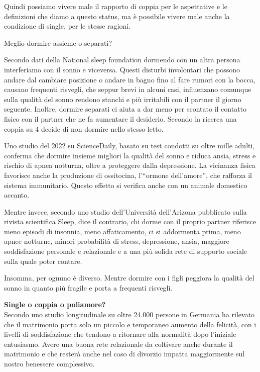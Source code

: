 \documentclass[12pt]{book} %
\begin{document}
Quindi possiamo vivere male il rapporto di coppia per le aspettative e le definizioni che diamo a questo status, ma è
possibile vivere male anche la condizione di single, per le stesse ragioni.

\begin{mdframed}[linewidth=1pt]
Meglio dormire assieme o separati? 

Secondo dati della National sleep foundation dormendo con un altra persona interferiamo con il sonno e viceversa. Questi
disturbi involontari che possono andare dal cambiare posizione o andare in bagno fino al fare rumori con la bocca,
causano frequenti risvegli, che seppur brevi in alcuni casi, influenzano comunque sulla qualità del sonno rendono
stanchi e più irritabili con il partner il giorno seguente. Inoltre, dormire separati ci aiuta a dar meno per scontato
il contatto fisico con il partner che ne fa aumentare il desiderio. Secondo la ricerca una coppia su 4 decide di non
dormire nello stesso letto.

Uno studio del 2022 su ScienceDaily, basato su test condotti su oltre mille adulti, conferma che dormire insieme migliori la qualità del sonno e riduca ansia, stress e rischio di apnea notturna, oltre a proteggere dalla depressione. La vicinanza fisica favorisce anche la produzione di ossitocina, l'“ormone dell'amore”, che rafforza il sistema immunitario. Questo effetto si verifica anche con un animale domestico accanto.

Mentre invece, secondo uno studio dell'Università dell'Arizona pubblicato sulla rivista scientifica
Sleep, dice il contrario, chi
dorme con il proprio partner riferisce meno episodi di insonnia, meno affaticamento, ci si addormenta prima, meno apnee
notturne, minori probabilità di stress, depressione, ansia, maggiore soddisfazione personale e relazionale e a una più
solida rete di supporto sociale sulla quale poter contare. 

Insomma, per ognuno è diverso. Mentre dormire con i figli peggiora la qualità del sonno in quanto più fragile e porta a frequenti risvegli.
\end{mdframed}

\noindent \textbf{\large Single o coppia o poliamore?} \\
Secondo uno studio longitudinale su oltre 24.000 persone in Germania ha rilevato che il matrimonio porta solo un piccolo e temporaneo aumento della felicità, con i livelli di soddisfazione che tendono a ritornare alla normalità dopo l'iniziale entusiasmo. Avere una buona rete relazionale da coltivare anche durante il matrimonio e che resterà anche nel caso di divorzio impatta maggiormente sul nostro benessere complessivo.
\end{document}
